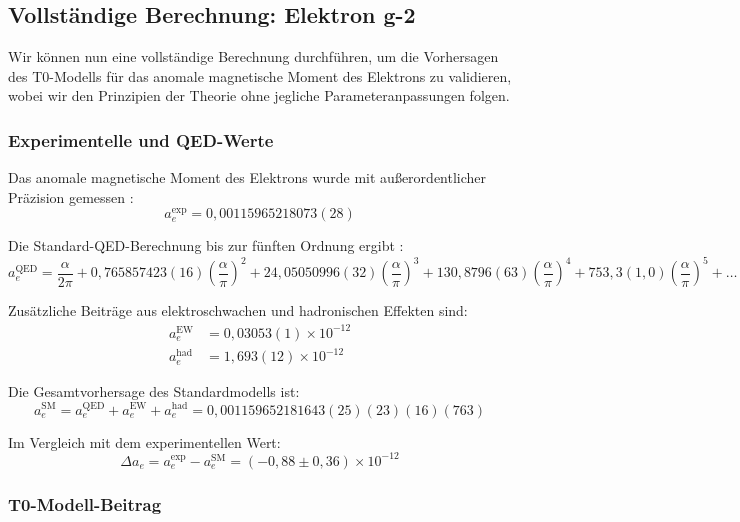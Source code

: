 \documentclass[12pt,a4paper]{article}
\begin{document}
	\subsection{Vollständige Berechnung: Elektron g-2}
	\label{subsec:complete_calculation}
	
	Wir können nun eine vollständige Berechnung durchführen, um die Vorhersagen des T0-Modells für das anomale magnetische Moment des Elektrons zu validieren, wobei wir den Prinzipien der Theorie ohne jegliche Parameteranpassungen folgen.
	
	\subsubsection{Experimentelle und QED-Werte}
	
	Das anomale magnetische Moment des Elektrons wurde mit außerordentlicher Präzision gemessen \cite{Hanneke2008}:
	\begin{equation}
		a_e^{\text{exp}} = 0,00115965218073(28)
	\end{equation}
	
	Die Standard-QED-Berechnung bis zur fünften Ordnung ergibt \cite{Aoyama2019}:
	\begin{equation}
		a_e^{\text{QED}} = \frac{\alpha}{2\pi} + 0,765857423(16) \left(\frac{\alpha}{\pi}\right)^2 + 24,05050996(32) \left(\frac{\alpha}{\pi}\right)^3 + 130,8796(63) \left(\frac{\alpha}{\pi}\right)^4 + 753,3(1,0) \left(\frac{\alpha}{\pi}\right)^5 + \ldots
	\end{equation}
	
	Zusätzliche Beiträge aus elektroschwachen und hadronischen Effekten sind:
	\begin{align}
		a_e^{\text{EW}} &= 0,03053(1) \times 10^{-12} \\
		a_e^{\text{had}} &= 1,693(12) \times 10^{-12}
	\end{align}
	
	Die Gesamtvorhersage des Standardmodells ist:
	\begin{equation}
		a_e^{\text{SM}} = a_e^{\text{QED}} + a_e^{\text{EW}} + a_e^{\text{had}} = 0,001159652181643(25)(23)(16)(763)
	\end{equation}
	
	Im Vergleich mit dem experimentellen Wert:
	\begin{equation}
		\Delta a_e = a_e^{\text{exp}} - a_e^{\text{SM}} = (-0,88 \pm 0,36) \times 10^{-12}
	\end{equation}
	
	\subsubsection{T0-Modell-Beitrag}
	
\end{document}
